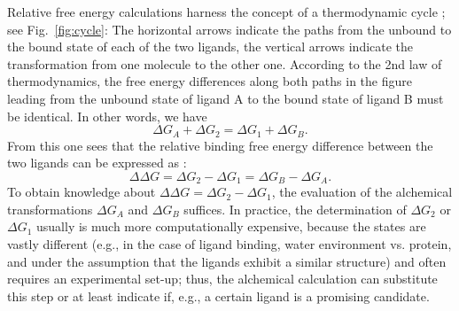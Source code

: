 Relative free energy calculations harness the concept of a thermodynamic
cycle \cite{Kollman.}; see Fig.~\ref{fig:cycle}: The horizontal arrows indicate the
paths from the unbound to the bound state of each of the two ligands,
the vertical arrows indicate the transformation from one molecule
to the other one. According to the 2nd law of thermodynamics, the free energy differences along both paths
in the figure leading from the unbound state of ligand A to the bound state
of ligand B must be identical. In other words, we have
\begin{equation}
\Delta G_{A}+\Delta G_{2}=\Delta G_{1}+\Delta G_{B}.
\end{equation}
From this one sees that the relative binding free energy difference between the two ligands can be expressed as \cite{Cournia.2017}:
\begin{equation}
\Delta\Delta G=\Delta G_{2}-\Delta G_{1}=\Delta G_{B}-\Delta G_{A}.
\end{equation}
To obtain knowledge about $\Delta\Delta G=\Delta G_{2}-\Delta G_{1}$,
the evaluation of the alchemical transformations $\Delta G_{A}$ and
$\Delta G_{B}$ suffices. In practice, the determination
of $\Delta G_{2}$ or $\Delta G_{1}$ usually is much more computationally expensive, because the states are vastly different (e.g., in the case of ligand binding, water environment vs. protein, and under the assumption that the ligands exhibit a similar structure) and often requires an experimental
set-up; thus, the alchemical calculation can substitute this step
or at least indicate if, e.g., a certain ligand is a promising candidate.

